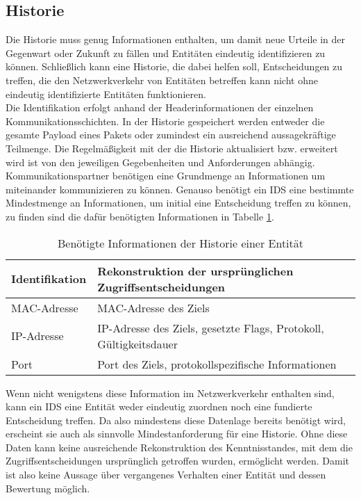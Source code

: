 \subsection{Historie}
\label{subs:Form_Hist}
Die Historie muss genug Informationen enthalten, um damit neue Urteile in der Gegenwart oder Zukunft zu fällen und Entitäten eindeutig identifizieren zu können. Schließlich kann eine Historie, die dabei helfen soll, Entscheidungen zu treffen, die den Netzwerkverkehr von Entitäten betreffen kann nicht ohne eindeutig identifizierte Entitäten funktionieren.\\ Die Identifikation erfolgt anhand der Headerinformationen der einzelnen Kommunikationsschichten. In der Historie gespeichert werden entweder die gesamte Payload eines Pakets oder zumindest ein ausreichend aussagekräftige Teilmenge. Die Regelmäßigkeit mit der die Historie aktualisiert bzw. erweitert wird ist von den jeweiligen Gegebenheiten und Anforderungen abhängig. Kommunikationspartner benötigen eine Grundmenge an Informationen um miteinander kommunizieren zu können. Genauso benötigt ein IDS  eine bestimmte Mindestmenge an Informationen, um initial eine Entscheidung treffen zu können, zu finden sind die dafür benötigten Informationen in Tabelle \ref{Tabelle_3}.
\begin{table}[H]
\label{Tabelle_3}
\caption{Benötigte Informationen der Historie einer Entität}
\begin{tabularx}{\columnwidth}{p{3cm} p{12cm}}
\toprule
Identifikation & Rekonstruktion der ursprünglichen  Zugriffsentscheidungen\\
\midrule
MAC-Adresse & MAC-Adresse des Ziels \\
IP-Adresse & IP-Adresse des Ziels, gesetzte Flags, Protokoll, Gültigkeitsdauer \\
Port & Port des Ziels, protokollspezifische Informationen \\
\bottomrule
\end{tabularx}
\end{table}
Wenn nicht wenigstens diese Information im Netzwerkverkehr enthalten sind, kann ein IDS eine Entität weder eindeutig zuordnen noch eine fundierte Entscheidung treffen. Da also mindestens diese Datenlage bereits benötigt wird, erscheint sie auch als sinnvolle Mindestanforderung für eine Historie. Ohne diese Daten kann keine ausreichende Rekonstruktion des Kenntnisstandes, mit dem die Zugriffsentscheidungen ursprünglich getroffen wurden, ermöglicht werden. Damit ist also keine Aussage über vergangenes Verhalten einer Entität und dessen Bewertung möglich.
